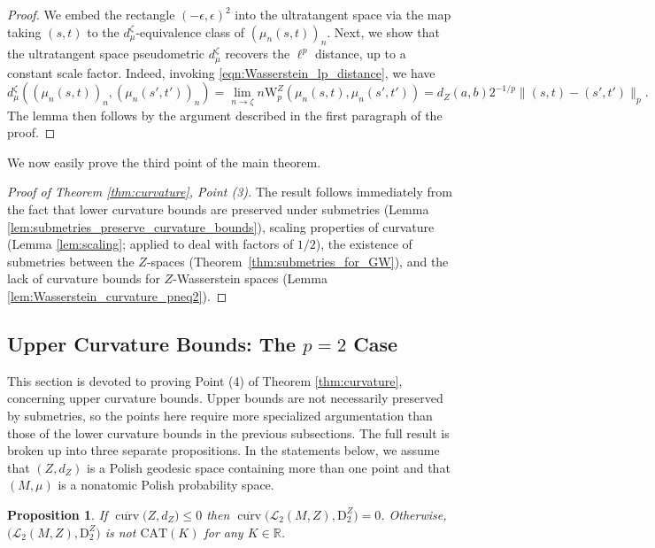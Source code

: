 \documentclass{article}
\newtheorem{proposition}{Proposition}[section]
\theoremstyle{definition}
\newcommand{\R}{\mathbb{R}}
\newcommand{\wz}{\mathrm{W}_p^Z}
\newcommand{\Lpp}[1]{\mathcal{L}_{#1}}
\newcommand{\dz}[1]{\mathrm{D}^Z_{#1}}
\newcommand{\curvupper}{\overline{\operatorname{curv}}}
\begin{document}
\begin{proof}
    We embed the rectangle $(-\epsilon,\epsilon)^2$ into the ultratangent space via the map taking $(s,t)$ to the $d_\mu^\zeta$-equivalence class of $(\mu_n(s,t))_n$. Next, we show that the ultratangent space pseudometric $d_\mu^\zeta$ recovers the $\ell^p$ distance, up to a constant scale factor. Indeed, invoking \eqref{eqn:Wasserstein_lp_distance}, we have  
    \[
    d_\mu^\zeta((\mu_n(s,t))_n,(\mu_n(s',t'))_n) = \lim_{n \to \zeta} n \wz(\mu_n(s,t),\mu_n(s',t')) = d_Z(a,b) 2^{-1/p} \|(s,t) - (s',t')\|_p.
    \]
    The lemma then follows by the argument described in the first paragraph of the proof.

    
    
\end{proof}


We now easily prove the third point of the main theorem.

\begin{proof}[Proof of Theorem \ref{thm:curvature}, Point (3)]
    The result follows immediately from the fact that lower curvature bounds are preserved under submetries (Lemma \ref{lem:submetries_preserve_curvature_bounds}), scaling properties of curvature (Lemma \ref{lem:scaling}; applied to deal with factors of $1/2$), the existence of submetries between the $Z$-spaces (Theorem~\ref{thm:submetries_for_GW}), and the lack of curvature bounds for $Z$-Wasserstein spaces (Lemma \ref{lem:Wasserstein_curvature_pneq2}).
\end{proof}



\subsection{Upper Curvature Bounds: The \texorpdfstring{$p=2$}{p=2} Case}\label{sec:upper_curvature}

This section is devoted to proving Point (4) of Theorem \ref{thm:curvature}, concerning upper curvature bounds. Upper bounds are not necessarily preserved by submetries, so the points here require more specialized argumentation than those of the lower curvature bounds in the previous subsections. The full result is broken up into three separate propositions. In the statements below, we assume that $(Z,d_Z)$ is a Polish geodesic space  containing more than one point and that $(M,\mu)$ is a nonatomic Polish probability space.

\begin{proposition}\label{prop:upper_curvature_Lp}
    If  $\curvupper \big(Z,d_Z\big) \leq 0$ then $\curvupper\big(\Lpp{2}(M,Z),\dz{2}\big) = 0$. Otherwise, $(\Lpp{2}(M,Z),\dz{2}\big)$ is not $\mathrm{CAT}(K)$ for any $K \in \R$.
\end{proposition}
\end{document}
